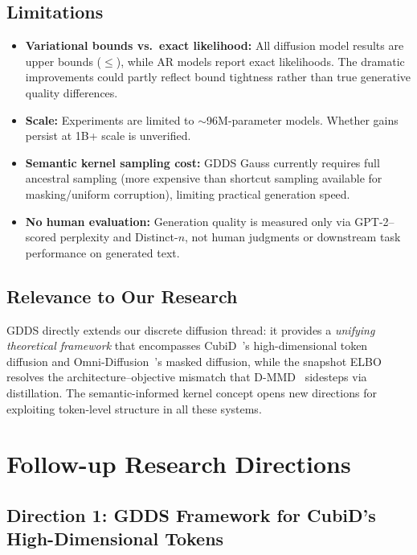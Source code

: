 \documentclass[11pt]{article}
\begin{document}
\subsection{Limitations}

\begin{itemize}
    \item \textbf{Variational bounds vs.\ exact likelihood:} All diffusion model results are upper bounds ($\leq$), while AR models report exact likelihoods. The dramatic improvements could partly reflect bound tightness rather than true generative quality differences.
    \item \textbf{Scale:} Experiments are limited to $\sim$96M-parameter models. Whether gains persist at 1B+ scale is unverified.
    \item \textbf{Semantic kernel sampling cost:} GDDS Gauss currently requires full ancestral sampling (more expensive than shortcut sampling available for masking/uniform corruption), limiting practical generation speed.
    \item \textbf{No human evaluation:} Generation quality is measured only via GPT-2--scored perplexity and Distinct-$n$, not human judgments or downstream task performance on generated text.
\end{itemize}

\subsection{Relevance to Our Research}

GDDS directly extends our discrete diffusion thread: it provides a \textit{unifying theoretical framework} that encompasses CubiD~\cite{cubid}'s high-dimensional token diffusion and Omni-Diffusion~\cite{omnidiffusion}'s masked diffusion, while the snapshot ELBO resolves the architecture--objective mismatch that D-MMD~\cite{dmmd} sidesteps via distillation. The semantic-informed kernel concept opens new directions for exploiting token-level structure in all these systems.

\section{Follow-up Research Directions}

\subsection{Direction 1: GDDS Framework for CubiD's High-Dimensional Tokens}
\end{document}

